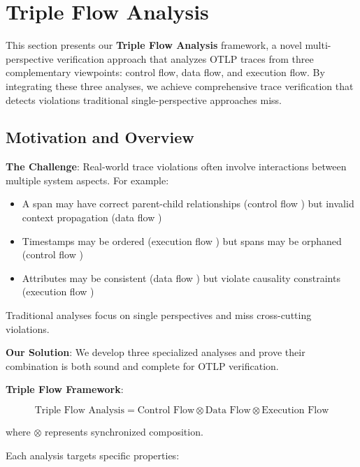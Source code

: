 
\section{Triple Flow Analysis}
\label{sec:triple-flow}

This section presents our \textbf{Triple Flow Analysis} framework, a novel multi-perspective verification approach that analyzes OTLP traces from three complementary viewpoints: control flow, data flow, and execution flow. By integrating these three analyses, we achieve comprehensive trace verification that detects violations traditional single-perspective approaches miss.

\subsection{Motivation and Overview}
\label{sec:triple-flow-motivation}

\textbf{The Challenge}: Real-world trace violations often involve interactions between multiple system aspects. For example:
\begin{itemize}
\item A span may have correct parent-child relationships (control flow \checkmark) but invalid context propagation (data flow \xmark)
\item Timestamps may be ordered (execution flow \checkmark) but spans may be orphaned (control flow \xmark)
\item Attributes may be consistent (data flow \checkmark) but violate causality constraints (execution flow \xmark)
\end{itemize}

Traditional analyses focus on single perspectives and miss cross-cutting violations.

\textbf{Our Solution}: We develop three specialized analyses and prove their combination is both sound and complete for OTLP verification.

\textbf{Triple Flow Framework}:

\[
\text{Triple Flow Analysis} = \text{Control Flow} \otimes \text{Data Flow} \otimes \text{Execution Flow}
\]

where $\otimes$ represents synchronized composition.

Each analysis targets specific properties:

